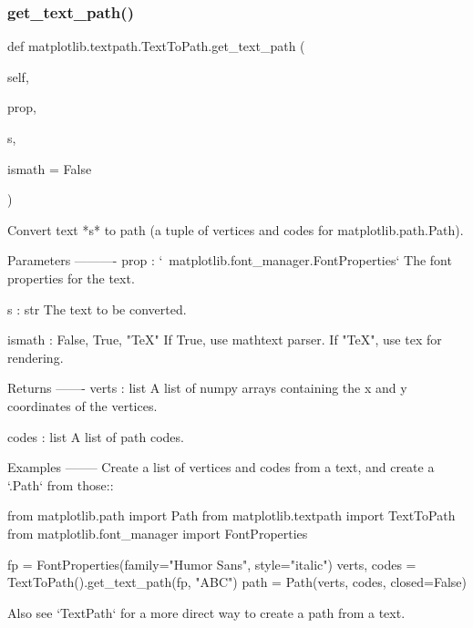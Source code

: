 \subsubsection{\texorpdfstring{get\+\_\+text\+\_\+path()}{get\_text\_path()}}
{\footnotesize\ttfamily def matplotlib.\+textpath.\+Text\+To\+Path.\+get\+\_\+text\+\_\+path (\begin{DoxyParamCaption}\item[{}]{self,  }\item[{}]{prop,  }\item[{}]{s,  }\item[{}]{ismath = {\ttfamily False} }\end{DoxyParamCaption})}

\begin{DoxyVerb}Convert text *s* to path (a tuple of vertices and codes for
matplotlib.path.Path).

Parameters
----------
prop : `~matplotlib.font_manager.FontProperties`
    The font properties for the text.

s : str
    The text to be converted.

ismath : {False, True, "TeX"}
    If True, use mathtext parser.  If "TeX", use tex for rendering.

Returns
-------
verts : list
    A list of numpy arrays containing the x and y coordinates of the
    vertices.

codes : list
    A list of path codes.

Examples
--------
Create a list of vertices and codes from a text, and create a `.Path`
from those::

    from matplotlib.path import Path
    from matplotlib.textpath import TextToPath
    from matplotlib.font_manager import FontProperties

    fp = FontProperties(family="Humor Sans", style="italic")
    verts, codes = TextToPath().get_text_path(fp, "ABC")
    path = Path(verts, codes, closed=False)

Also see `TextPath` for a more direct way to create a path from a text.
\end{DoxyVerb}
 \mbox{\label{classmatplotlib_1_1textpath_1_1TextToPath_a2ec9058db45d1dbf46afefff1b516a38}} 

